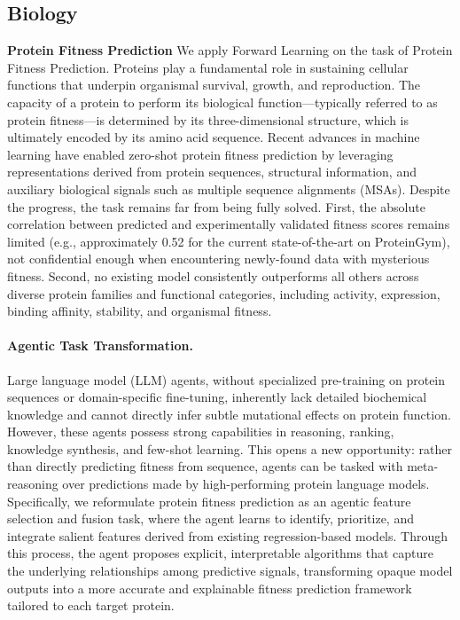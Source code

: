 \documentclass{article}
\newcommand{\method}{Forward Learning}
\begin{document}
\subsection{Biology}


\textbf{Protein Fitness Prediction} We apply \method{} on the task of Protein Fitness Prediction. Proteins play a fundamental role in sustaining cellular functions that underpin organismal survival, growth, and reproduction. The capacity of a protein to perform its biological function—typically referred to as protein fitness—is determined by its three-dimensional structure, which is ultimately encoded by its amino acid sequence. Recent advances in machine learning have enabled zero-shot protein fitness prediction by leveraging representations derived from protein sequences, structural information, and auxiliary biological signals such as multiple sequence alignments (MSAs). Despite the progress, the task remains far from being fully solved. First, the absolute correlation between predicted and experimentally validated fitness scores remains limited (e.g., approximately 0.52 for the current state-of-the-art on ProteinGym), not confidential enough when encountering newly-found data with mysterious fitness. Second, no existing model consistently outperforms all others across diverse protein families and functional categories, including activity, expression, binding affinity, stability, and organismal fitness.




\paragraph{Agentic Task Transformation.} Large language model (LLM) agents, without specialized pre-training on protein sequences or domain-specific fine-tuning, inherently lack detailed biochemical knowledge and cannot directly infer subtle mutational effects on protein function. However, these agents possess strong capabilities in reasoning, ranking, knowledge synthesis, and few-shot learning. This opens a new opportunity: rather than directly predicting fitness from sequence, agents can be tasked with meta-reasoning over predictions made by high-performing protein language models. Specifically, we reformulate protein fitness prediction as an agentic feature selection and fusion task, where the agent learns to identify, prioritize, and integrate salient features derived from existing regression-based models. Through this process, the agent proposes explicit, interpretable algorithms that capture the underlying relationships among predictive signals, transforming opaque model outputs into a more accurate and explainable fitness prediction framework tailored to each target protein.
\end{document}
